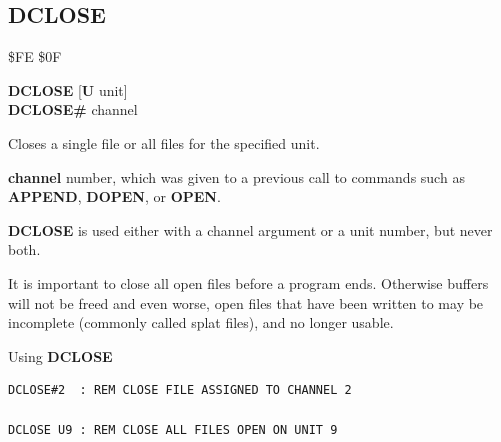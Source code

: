 \subsection{DCLOSE}
\begin{description}[leftmargin=2cm,style=nextline]
\item [Token:]    \$FE \$0F

\item [Format:]   {\bf DCLOSE} [{\bf U} unit] \\
		            {\bf DCLOSE\#} channel

\item [Usage:]    Closes a single file or all files for the specified unit.

                  {\bf channel} number, which was given to a previous call to commands such as {\bf APPEND}, {\bf DOPEN}, or {\bf OPEN}.

                  \unitdefinition

                  {\bf DCLOSE} is used either with a channel argument or a unit number, but never both.

\item [Remarks:]  It is important to close all open files before a program ends. Otherwise buffers will not be freed and even worse, open files that have been written to may be incomplete (commonly called splat files), and no longer usable.

\item [Examples:] Using {\bf DCLOSE}

\begin{tcolorbox}[colback=black,coltext=white]
\verbatimfont{\codefont}
\begin{verbatim}
DCLOSE#2  : REM CLOSE FILE ASSIGNED TO CHANNEL 2

DCLOSE U9 : REM CLOSE ALL FILES OPEN ON UNIT 9
\end{verbatim}
\end{tcolorbox}
\end{description}


\newpage
